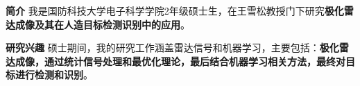 %
%

\par{
{\textbf{简介}} 
我是国防科技大学电子科学学院2年级硕士生，在王雪松教授门下研究\textbf{极化雷达成像及其在人造目标检测识别中的应用}。


{\textbf{研究兴趣}} 
硕士期间，我的研究工作涵盖雷达信号和机器学习，主要包括：\textbf{极化雷达成像，通过统计信号处理和最优化理论，最后结合机器学习相关方法，最终对目标进行检测和识别}。
}